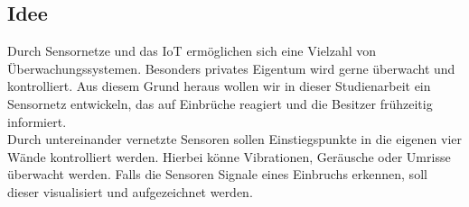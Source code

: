 \subsection{Idee}\label{ss:Idee}

Durch Sensornetze und das \ac{IoT} ermöglichen sich eine Vielzahl von Überwachungssystemen. Besonders privates Eigentum wird gerne überwacht und kontrolliert. Aus diesem Grund heraus wollen wir in dieser Studienarbeit ein Sensornetz entwickeln, das auf Einbrüche reagiert und die Besitzer frühzeitig informiert.\\

Durch untereinander vernetzte Sensoren sollen Einstiegspunkte in die eigenen vier Wände kontrolliert werden.
Hierbei könne Vibrationen, Geräusche oder Umrisse überwacht werden. Falls die Sensoren Signale eines Einbruchs erkennen, soll dieser visualisiert und aufgezeichnet werden.

  